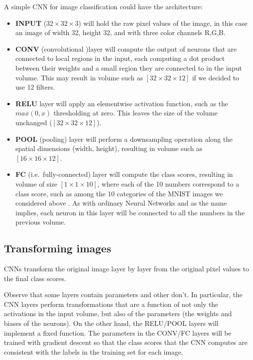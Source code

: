 \documentclass[%
oneside,                 %
final,                   %
10pt]{article}
\begin{document}
A simple CNN for image classification could have the architecture:

\begin{itemize}
\item \textbf{INPUT} ($32\times 32 \times 3$) will hold the raw pixel values of the image, in this case an image of width 32, height 32, and with three color channels R,G,B.

\item \textbf{CONV} (convolutional )layer will compute the output of neurons that are connected to local regions in the input, each computing a dot product between their weights and a small region they are connected to in the input volume. This may result in volume such as $[32\times 32\times 12]$ if we decided to use 12 filters.

\item \textbf{RELU} layer will apply an elementwise activation function, such as the $max(0,x)$ thresholding at zero. This leaves the size of the volume unchanged ($[32\times 32\times 12]$).

\item \textbf{POOL} (pooling) layer will perform a downsampling operation along the spatial dimensions (width, height), resulting in volume such as $[16\times 16\times 12]$.

\item \textbf{FC} (i.e.~fully-connected) layer will compute the class scores, resulting in volume of size $[1\times 1\times 10]$, where each of the 10 numbers correspond to a class score, such as among the 10 categories of the MNIST images we considered above . As with ordinary Neural Networks and as the name implies, each neuron in this layer will be connected to all the numbers in the previous volume.
\end{itemize}

\noindent
\subsection{Transforming images}

CNNs transform the original image layer by layer from the original
pixel values to the final class scores. 

Observe that some layers contain
parameters and other don’t. In particular, the CNN layers perform
transformations that are a function of not only the activations in the
input volume, but also of the parameters (the weights and biases of
the neurons). On the other hand, the RELU/POOL layers will implement a
fixed function. The parameters in the CONV/FC layers will be trained
with gradient descent so that the class scores that the CNN computes
are consistent with the labels in the training set for each image.
\end{document}
